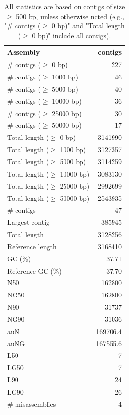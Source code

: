 \documentclass[12pt,a4paper]{article}
\begin{document}
\begin{table}[ht]
\begin{center}
\caption{All statistics are based on contigs of size $\geq$ 500 bp, unless otherwise noted (e.g., "\# contigs ($\geq$ 0 bp)" and "Total length ($\geq$ 0 bp)" include all contigs).}
\begin{tabular}{|l*{1}{|r}|}
\hline
Assembly & contigs \\ \hline
\# contigs ($\geq$ 0 bp) & 227 \\ \hline
\# contigs ($\geq$ 1000 bp) & 46 \\ \hline
\# contigs ($\geq$ 5000 bp) & 40 \\ \hline
\# contigs ($\geq$ 10000 bp) & 36 \\ \hline
\# contigs ($\geq$ 25000 bp) & 30 \\ \hline
\# contigs ($\geq$ 50000 bp) & 17 \\ \hline
Total length ($\geq$ 0 bp) & 3141990 \\ \hline
Total length ($\geq$ 1000 bp) & 3127357 \\ \hline
Total length ($\geq$ 5000 bp) & 3114259 \\ \hline
Total length ($\geq$ 10000 bp) & 3083130 \\ \hline
Total length ($\geq$ 25000 bp) & 2992699 \\ \hline
Total length ($\geq$ 50000 bp) & 2543935 \\ \hline
\# contigs & 47 \\ \hline
Largest contig & 385945 \\ \hline
Total length & 3128256 \\ \hline
Reference length & 3168410 \\ \hline
GC (\%) & 37.71 \\ \hline
Reference GC (\%) & 37.70 \\ \hline
N50 & 162800 \\ \hline
NG50 & 162800 \\ \hline
N90 & 31737 \\ \hline
NG90 & 31036 \\ \hline
auN & 169706.4 \\ \hline
auNG & 167555.6 \\ \hline
L50 & 7 \\ \hline
LG50 & 7 \\ \hline
L90 & 24 \\ \hline
LG90 & 26 \\ \hline
\# misassemblies & 4 \\ \hline

\end{tabular}
\end{center}
\end{table}
\end{document}
